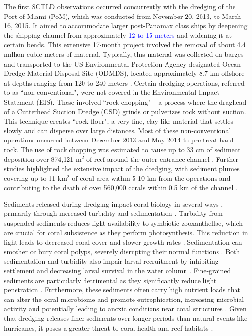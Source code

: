 \documentclass[preprint,12pt,authoryear]{elsarticle}
\newcommand{\modif}[1]{\textcolor{blue}{#1}}
\begin{document}
The first SCTLD observations occurred concurrently with the dredging of the Port of Miami (PoM), which was conducted from November 20, 2013, to March 16, 2015. It aimed to accommodate larger post-Panamax class ships by deepening the shipping channel from approximately \modif{12 to 15 meters} and widening it at certain bends. This extensive 17-month project involved the removal of about 4.4 million cubic meters of material. Typically, this material was collected on barges and transported to the US Environmental Protection Agency-designated Ocean Dredge Material Disposal Site (ODMDS), located approximately 8.7 km offshore at depths ranging from 120 to 240 meters \citep{noaa2023sedimentation}. Certain dredging operations, referred to as ``non-conventional", were not covered in the Environmental Impact Statement (EIS). These involved ``rock chopping" -- a process where the draghead of a Cutterhead Suction Dredge (CSD) grinds or pulverizes rock without suction. This technique creates ``rock flour", a very fine, clay-like material that settles slowly and can disperse over large distances. Most of these non-conventional operations occurred between December 2013 and May 2014 to pre-treat hard rock. The use of rock chopping was estimated to cause up to 33 cm of sediment deposition over 874,121 m$^2$ of reef around the outer entrance channel \citep{usace2017}. Further studies highlighted the extensive impact of the dredging, with sediment plumes covering up to 11 km$^2$ of coral area within 5-10 km from the operations \citep{barnes2015sediment} and contributing to the death of over 560,000 corals within 0.5 km of the channel \citep{cunning2019extensive}.


Sediments released during dredging impact coral biology in several ways \citep{fabricius2005effects}, primarily through increased turbidity and sedimentation \citep{erftemeijer2012environmental,jones2015effects}. Turbidity from suspended sediments reduces light availability to symbiotic zooxanthellae, which are crucial for coral subsistence as they perform photosynthesis. This reduction in light leads to decreased coral cover and slower growth rates \citep{kendall1983effects, rogers1990responses, anthony1999tank, hennige2008photoacclimation}. Sedimentation can smother or bury coral polyps, severely disrupting their normal functions \citep{erftemeijer2012environmental, jones2015effects, jones2019sediment}. Both sedimentation and turbidity also impair larval recruitment by inhibiting settlement and decreasing larval survival in the water column \citep{jones2015effects}. Fine-grained sediments are particularly detrimental as they significantly reduce light penetration \citep{storlazzi2015influence, fourney2017additive}. Furthermore, these sediments often carry high nutrient loads that can alter the coral microbiome and promote eutrophication, increasing microbial activity and potentially leading to anoxic conditions near coral structures \citep{rosales2019oceanographic, wittenberg1992effects, weber2012mechanisms}. Given that dredging releases finer sediments over longer periods than natural events like hurricanes, it poses a greater threat to coral health and reef habitats \citep{cunning2019extensive}.
\end{document}
